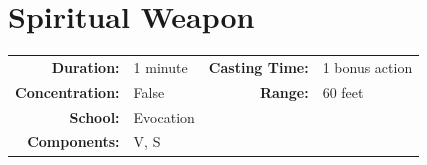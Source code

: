 \documentclass[12pt,showtrims]{memoir}
\begin{document}
\newpage
{}
\newpage
\section*{Spiritual Weapon}

{
\small\centering\vspace{-6pt}
\begin{tabular}{rlrl}
\toprule

\textbf{Duration:} & 1 minute &
\textbf{Casting Time:} & 1 bonus action \\
\textbf{Concentration:} & False &
\textbf{Range:} & 60 feet \\
\textbf{School:} & Evocation \\
\textbf{Components:} & \multicolumn{3}{p{0.7\textwidth}}{V, S}\\

\bottomrule
\end{tabular}
}
\end{document}
